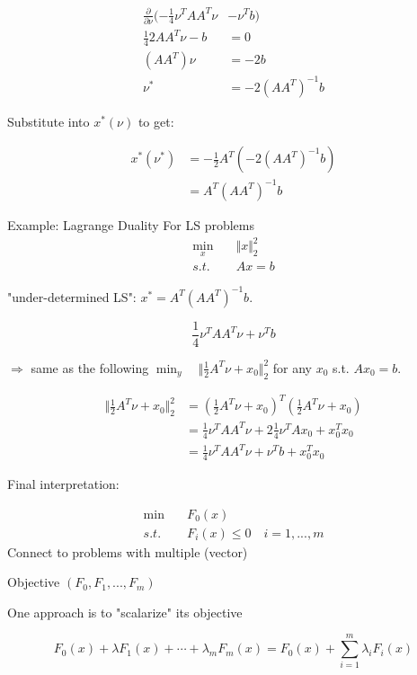 \begin{align*}
\frac{\partial}{\partial \nu}(-\frac{1}{4}\nu^TAA^T\nu &- \nu^Tb)\\
\frac{1}{4}2AA^T\nu - b &= 0\\
(AA^T)\nu &= -2b\\
\nu^* &= -2(AA^T)^{-1}b
\end{align*}

Substitute into $x^*(\nu)$ to get:

\begin{align*}
x^*(\nu^*) &= -\frac{1}{2}A^T(-2(AA^T)^{-1}b)\\
&= A^T(AA^T)^{-1}b
\end{align*}

Example: Lagrange Duality For LS problems
\begin{align*}
\min_x \quad & \Vert x\Vert^2_2\\
s.t. \quad & Ax = b
\end{align*}

"under-determined LS": $x^* = A^T(AA^T)^{-1}b$.

\begin{equation*}
\frac{1}{4}\nu^TAA^T\nu+\nu^Tb
\end{equation*}

$\Rightarrow$ same as the following $\min_y\quad \Vert\frac{1}{2}A^T\nu + x_0\Vert^2_2$ for any $x_0$ s.t. $Ax_0 = b$.

\begin{align*}
\Vert \frac{1}{2}A^T\nu + x_0\Vert_2^2 &= (\frac{1}{2}A^T\nu+x_0)^T(\frac{1}{2}A^T\nu+x_0)\\
&= \frac{1}{4}\nu^TAA^T\nu + 2\frac{1}{4}\nu^TAx_0 + x_0^Tx_0\\
&= \frac{1}{4}\nu^TAA^T\nu + \nu^Tb+x_0^Tx_0
\end{align*}

Final interpretation:

\begin{align*}
\min \quad & F_0(x)\\
s.t. \quad & F_i(x)\leq 0\quad i = 1,...,m
\end{align*}
Connect to problems with multiple (vector)

Objective $(F_0,F_1,...,F_m)$

One approach is to "scalarize" its objective

\begin{equation*}
F_0(x) + \lambda F_1(x) + \cdots + \lambda_mF_m(x) = F_0(x) + \sum^m_{i=1}\lambda_iF_i(x)
\end{equation*}

